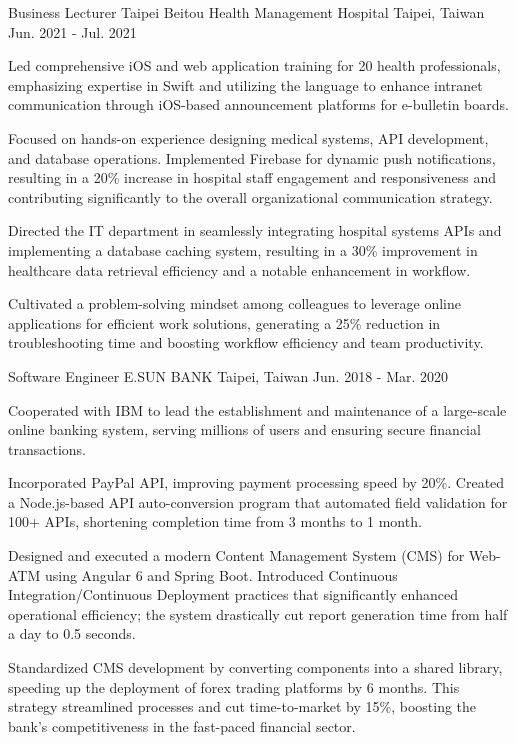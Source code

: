 \begin{cventries}
  \cventry
  {Business Lecturer} %
  {Taipei Beitou Health Management Hospital} %
  {Taipei, Taiwan} %
  {Jun. 2021 - Jul. 2021} %
  {
    \begin{cvitems} %
      \item {Led comprehensive iOS and web application training for 20 health professionals, emphasizing expertise in Swift and utilizing the language to enhance intranet communication through iOS-based announcement platforms for e-bulletin boards.}
      \item {Focused on hands-on experience designing medical systems, API development, and database operations. Implemented Firebase for dynamic push notifications, resulting in a 20\% increase in hospital staff engagement and responsiveness and contributing significantly to the overall organizational communication strategy.}
      \item {Directed the IT department in seamlessly integrating hospital systems APIs and implementing a database caching system, resulting in a 30\% improvement in healthcare data retrieval efficiency and a notable enhancement in workflow.}
      \item {Cultivated a problem-solving mindset among colleagues to leverage online applications for efficient work solutions, generating a 25\% reduction in troubleshooting time and boosting workflow efficiency and team productivity.}
    \end{cvitems}
  }

  \cventry
    {Software Engineer} %
    {E.SUN BANK} %
    {Taipei, Taiwan} %
    {Jun. 2018 - Mar. 2020} %
    {
      \begin{cvitems} %
        \item {Cooperated with IBM to lead the establishment and maintenance of a large-scale online banking system, serving millions of users and ensuring secure financial transactions.}
        \item {Incorporated PayPal API, improving payment processing speed by 20\%. Created a Node.js-based API auto-conversion program that automated field validation for 100+ APIs, shortening completion time from 3 months to 1 month.}
        \item {Designed and executed a modern Content Management System (CMS) for Web-ATM using Angular 6 and Spring Boot. Introduced Continuous Integration/Continuous Deployment practices that significantly enhanced operational efficiency; the system drastically cut report generation time from half a day to 0.5 seconds.}
        \item {Standardized CMS development by converting components into a shared library, speeding up the deployment of forex trading platforms by 6 months. This strategy streamlined processes and cut time-to-market by 15\%, boosting the bank's competitiveness in the fast-paced financial sector.}
      \end{cvitems}
    }


\end{cventries}
